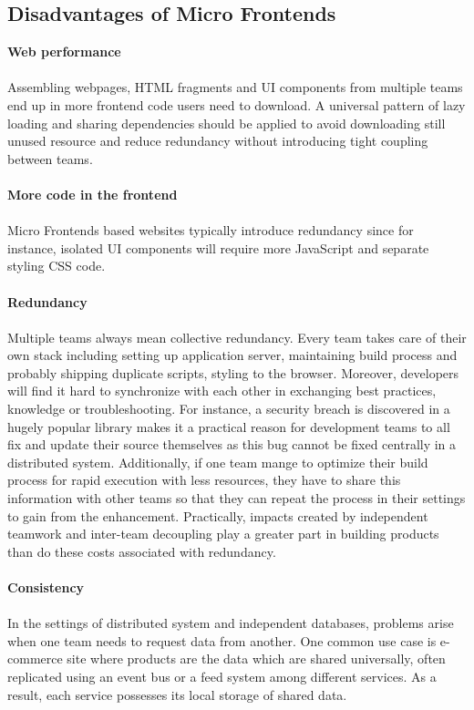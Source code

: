 \documentclass[a4paper]{book}
\begin{document}
\subsection{Disadvantages of Micro Frontends }
\textbf{Web performance}
\\ \\ 
Assembling webpages, HTML fragments and UI components from multiple teams end up in more frontend code users need to download. A universal pattern of lazy loading and sharing dependencies should be applied to avoid downloading still unused resource and reduce redundancy without introducing tight coupling between teams. 
\\ \\ 
\textbf{More code in the frontend}
\\ \\ 
Micro Frontends based websites typically introduce redundancy since for instance, isolated UI components will require more JavaScript and separate styling CSS code.
\\ \\
\textbf{Redundancy}
\\ \\
Multiple teams always mean collective redundancy. Every team takes care of their own stack including setting up application server, maintaining build process and probably shipping duplicate scripts, styling to the browser. Moreover, developers will find it hard to synchronize with each other in exchanging best practices, knowledge or troubleshooting. For instance, a security breach is discovered in a hugely popular library makes it a practical reason for development teams to all fix and update their source themselves as this bug cannot be fixed centrally in a distributed system. Additionally, if one team mange to optimize their build process for rapid execution with less resources, they have to share this information with other teams so that they can repeat the process in their settings to gain from the enhancement. Practically, impacts created by independent teamwork and inter-team decoupling play a greater part in building products than do these costs associated with redundancy.
\\ \\
\textbf{Consistency}
\\ \\ 
In the settings of distributed system and independent databases, problems arise when one team needs to request data from another. One common use case is e-commerce site where products are the data which are shared universally, often replicated using an event bus or a feed system among different services. As a result, each service possesses its local storage of shared data.
\end{document}
